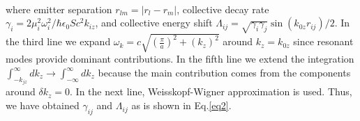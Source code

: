 \documentclass[aps,showpacs,twocolumn,twoside,groupedaddress]{revtex4}
\begin{document}
\begin{widetext}
\begin{equation}
\begin{split}
\end{split}
\end{equation}
where emitter separation $r_{lm}=|r_{l}-r_{m}|$, collective decay rate $\gamma_{i}=2\mu_{i}^{2}\omega_{i}^{2}/\hbar\epsilon_{0}Sc^{2}k_{iz}$, and collective energy shift $\Lambda_{ij}=\sqrt{\gamma_{i}\gamma_{j}}\sin(k_{0z}r_{ij})/2$.
In the third line we expand $\omega_{k}=c\sqrt{(\frac{\pi}{a})^{2}+(k_{z})^{2}}$ around $k_{z}=k_{0z}$ since resonant modes provide dominant contributions. In the fifth line we extend the integration $\int_{-k_{jz}}^{\infty}dk_{z}\rightarrow\int_{-\infty}^{\infty}dk_{z}$ because the main contribution comes from the components around $\delta k_{z}=0$. In the next line, Weisskopf-Wigner approximation is used. Thus, we have obtained $\gamma_{ij}$ and $\Lambda_{ij}$ as is shown in Eq.\eqref{eq2}. 


\end{widetext}
\end{document}
